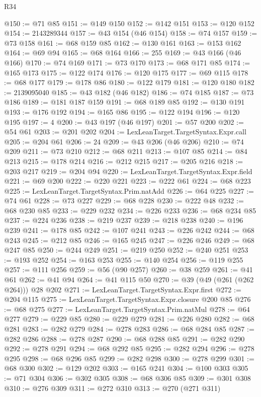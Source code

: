 \begin{lexlean}{R34}
\begin{coremodule}
@150 := @71 @85
@151 := @149 @150
@152 := @142 @151
@153 := @120 @152
@154 := 2143289344
@157 := @43 @154 (@46 @154)
@158 := @74 @157
@159 := @73 @158
@161 := @68 @159 @85
@162 := @130 @161
@163 := @153 @162
@164 := @69 @94
@165 := @68 @164
@166 := 255
@169 := @43 @166 (@46 @166)
@170 := @74 @169
@171 := @73 @170
@173 := @68 @171 @85
@174 := @165 @173
@175 := @122 @174
@176 := @120 @175
@177 := @69 @115
@178 := @68 @177
@179 := @178 @86
@180 := @122 @179
@181 := @120 @180
@182 := 2139095040
@185 := @43 @182 (@46 @182)
@186 := @74 @185
@187 := @73 @186
@189 := @181 @187 @159
@191 := @68 @189 @85
@192 := @130 @191
@193 := @176 @192
@194 := @165 @86
@195 := @122 @194
@196 := @120 @195
@197 := 4
@200 := @43 @197 (@46 @197)
@201 := @57 @200
@202 := @54 @61
@203 := @201 @202
@204 := LexLeanTarget.TargetSyntax.Expr.call
@205 := @204 @61
@206 := 24
@209 := @43 @206 (@46 @206)
@210 := @74 @209
@211 := @73 @210
@212 := @68 @211
@213 := @107 @85
@214 := @84 @213
@215 := @178 @214
@216 := @212 @215
@217 := @205 @216
@218 := @203 @217
@219 := @204 @94
@220 := LexLeanTarget.TargetSyntax.Expr.field
@221 := @69 @200
@222 := @220 @221
@223 := @222 @61
@224 := @68 @223
@225 := LexLeanTarget.TargetSyntax.Prim.natAdd
@226 := @64 @225
@227 := @74 @61
@228 := @73 @227
@229 := @68 @228
@230 := @222 @48
@232 := @68 @230 @85
@233 := @229 @232
@234 := @226 @233
@236 := @68 @234 @85
@237 := @224 @236
@238 := @219 @237
@239 := @218 @238
@240 := @196 @239
@241 := @178 @85
@242 := @107 @241
@243 := @226 @242
@244 := @68 @243
@245 := @212 @85
@246 := @165 @245
@247 := @226 @246
@249 := @68 @247 @85
@250 := @244 @249
@251 := @219 @250
@252 := @240 @251
@253 := @193 @252
@254 := @163 @253
@255 := @140 @254
@256 := @119 @255
@257 := @111 @256
@259 := @56 (@90 @257)
@260 := @38 @259
@261 := @41 @61
@262 := @41 @94
@264 := @41 @115 @50
@270 := @39 (@49 (@261 (@262 @264))) @28 @202
@271 := LexLeanTarget.TargetSyntax.Expr.first
@272 := @204 @115
@275 := LexLeanTarget.TargetSyntax.Expr.closure @200 @85
@276 := @68 @275
@277 := LexLeanTarget.TargetSyntax.Prim.natMul
@278 := @64 @277
@279 := @229 @85
@280 := @229 @279
@281 := @226 @280
@282 := @68 @281
@283 := @282 @279
@284 := @278 @283
@286 := @68 @284 @85
@287 := @282 @286
@288 := @278 @287
@290 := @68 @288 @85
@291 := @282 @290
@292 := @278 @291
@294 := @68 @292 @85
@295 := @282 @294
@296 := @278 @295
@298 := @68 @296 @85
@299 := @282 @298
@300 := @278 @299
@301 := @68 @300
@302 := @129 @202
@303 := @165 @241
@304 := @100 @303
@305 := @71 @304
@306 := @302 @305
@308 := @68 @306 @85
@309 := @301 @308
@310 := @276 @309
@311 := @272 @310
@313 := @270 (@271 @311)

\end{coremodule}
\end{lexlean}
